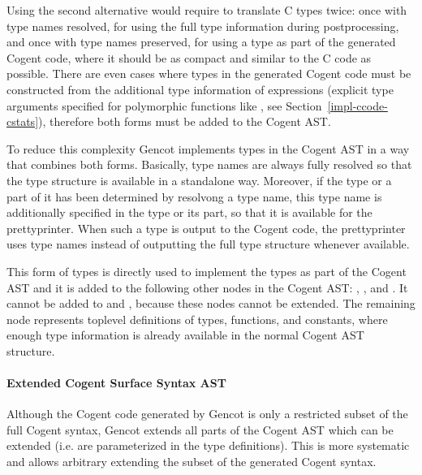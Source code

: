 Using the second alternative would require to translate C types twice: once with type names resolved, for using the full type
information during postprocessing, and once with type names preserved, for using a type as part of the generated Cogent
code, where it should be as compact and similar to the C code as possible. There are even cases where types in the generated
Cogent code must be constructed from the additional type information of expressions (explicit type arguments specified for
polymorphic functions like , see Section~\ref{impl-ccode-cstats}), therefore both forms must be added to the
Cogent AST.

To reduce this complexity Gencot implements types in the Cogent AST in a way that combines both forms. Basically, type names
are always fully resolved so that the type structure is available in a standalone way. Moreover, if the type or a part of
it has been determined by resolvong a type name, this type name is additionally specified in the type or its part, so that
it is available for the prettyprinter. When such a type is output to the Cogent code, the prettyprinter uses type names
instead of outputting the full type structure whenever available.

This form of types is directly used to implement the types as part of the Cogent AST and it is added to the following
other nodes in the Cogent AST: , , and . It cannot be added to
 and , because these nodes cannot be extended. The remaining node  represents
toplevel definitions of types, functions, and constants, where enough type information is already available in the
normal Cogent AST structure.

\paragraph{Extended Cogent Surface Syntax AST}

Although the Cogent code generated by Gencot is only a restricted subset of the full Cogent syntax, Gencot extends all parts 
of the Cogent AST which can be extended (i.e. are parameterized in the type definitions). This is more systematic and 
allows arbitrary extending the subset of the generated Cogent syntax.

